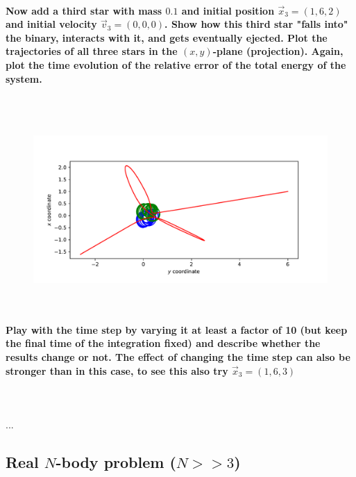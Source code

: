     \paragraph{Now add a third star with mass $0.1$ and initial position 
        $\vec x_3=(1,6,2)$ and initial velocity $\vec v_3=(0,0,0)$. Show how 
        this third star "falls into" the binary, interacts with it, and gets 
        eventually ejected. Plot the trajectories of all three stars in the 
        $(x,y)$-plane (projection). Again, plot the time evolution of the 
        relative error of the total energy of the system.
    } \ \\
        \\
        \begin{figure}[h!]
            \centering
            \includegraphics[width=\textwidth]{./figures/task2_3body.pdf}
            \caption{}
        \end{figure} \ \\ 
    
    \paragraph{Play with the time step by varying it at least a factor of 10 
        (but keep the final time of the integration fixed) and describe whether 
        the results change or not. The effect of changing the time step can 
        also be stronger than in this case, to see this also try 
        $\vec x_3=(1,6,3)$
    } \ \\
        \\
        ...

\subsection{Real $N$-body problem ($N>>3$)}
